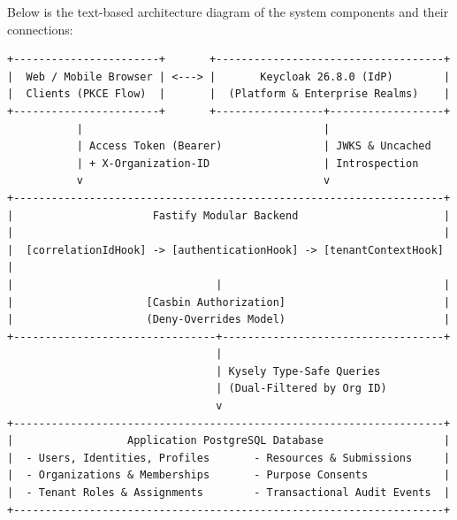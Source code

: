 \documentclass{article}
\begin{document}
Below is the text-based architecture diagram of the system components and their connections:

\begin{verbatim}
+-----------------------+       +------------------------------------+
|  Web / Mobile Browser | <---> |       Keycloak 26.8.0 (IdP)        |
|  Clients (PKCE Flow)  |       |  (Platform & Enterprise Realms)    |
+-----------------------+       +-----------------+------------------+
           |                                      |
           | Access Token (Bearer)                | JWKS & Uncached
           | + X-Organization-ID                  | Introspection
           v                                      v
+--------------------------------------------------------------------+
|                      Fastify Modular Backend                       |
|                                                                    |
|  [correlationIdHook] -> [authenticationHook] -> [tenantContextHook] |
|                                |                                   |
|                     [Casbin Authorization]                         |
|                     (Deny-Overrides Model)                         |
+--------------------------------+-----------------------------------+
                                 |
                                 | Kysely Type-Safe Queries
                                 | (Dual-Filtered by Org ID)
                                 v
+--------------------------------------------------------------------+
|                  Application PostgreSQL Database                   |
|  - Users, Identities, Profiles       - Resources & Submissions     |
|  - Organizations & Memberships       - Purpose Consents            |
|  - Tenant Roles & Assignments        - Transactional Audit Events  |
+--------------------------------------------------------------------+
\end{verbatim}
\end{document}
